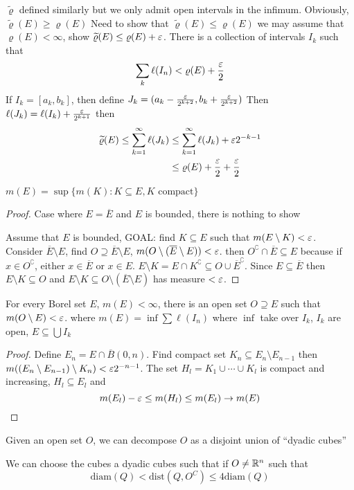 \begin{remark}
  $\widetilde{\varrho}$ defined similarly but we only admit open intervals in the infimum.
  Obviously, $\widetilde{\varrho}(E) \ge \varrho(E)$
  Need to show that $\widetilde{\varrho}(E)\le \varrho(E)$
  we may assume that $\varrho(E) < \infty$, show $\widetilde{\varrho}(E) \le \varrho(E) + \varepsilon$.
  There is a collection of intervals $I_k$ such that
  \[\sum_k \ell(I_n) < \varrho(E) + \frac{\varepsilon}2\]
  If $I_k = [a_k, b_k]$, then define $J_k = (a_k - \frac{\varepsilon}{2^{k+2}}, b_k + \frac{\varepsilon}{2^{k+2}})$
  Then $\ell(J_k) = \ell(I_k) + \frac{\varepsilon}{2^{k+1}}$ then
  \begin{align*}
    \widetilde{\varrho}(E) \le \sum_{k=1}^\infty \ell(J_k) &\le \sum_{k=1}^\infty \ell(J_k) + \varepsilon2^{-k-1} \\
    &\le \varrho(E) + \frac{\varepsilon}2 + \frac{\varepsilon}2
  \end{align*}

\end{remark}



\begin{lemma}
  $m(E) = \sup\{m(K) : K \subseteq E, K \text{ compact}\}$
\end{lemma}

\begin{proof}
  Case where $E = \overline{E}$ and $E$ is bounded, there is nothing to show

  Assume that $E$ is bounded, GOAL: find $K \subseteq E$ such that $m(E\setminus K) < \varepsilon$.
  Consider $\overline{E} \setminus E$, find $O \supseteq \overline{E} \setminus E$, $m(O\setminus (\overline{E} \setminus E)) < \varepsilon$.
  then $O^\complement \cap \overline{E} \subseteq E$ because if $x \in O^\complement$, either $x \in \overline{E}$ or $x \in E$.
  $E \setminus K = E \cap K^\complement \subseteq O \cup \overline{E}^\complement$.
  Since $E \subseteq \overline{E}$ then $E\setminus K \subseteq O$ and $E\setminus K \subseteq O \setminus (\overline{E} \setminus{E})$ 
  has measure $< \varepsilon$.
\end{proof}
\begin{theorem}
  For every Borel set $E$, $m(E) < \infty$, there is an open set $O\supseteq E$ such that $m(O\setminus E) < \varepsilon$.
  where $m(E) = \inf \sum \ell(I_n)$ where $\inf$ take over $I_k$, $I_k$ are open, $E \subseteq \bigcup I_k$
\end{theorem}

\begin{proof}
  Define $E_n = E \cap \overline{B}(0, n)$. Find compact set $K_n \subseteq E_n \setminus E_{n-1}$ then
  $m((E_n \setminus E_{n-1})\setminus K_n) < \varepsilon 2^{-n-1}$.
  The set $H_l = K_1 \cup \cdots \cup K_l$ is compact and increasing, $H_l \subseteq E_l$ and 
  \[m(E_l) - \varepsilon \le m(H_l) \le m(E_l) \to m(E)\]
\end{proof}

\begin{theorem}
  Given an open set $O$, we can decompose $O$ as a disjoint union of ``dyadic cubes''
\end{theorem}

\begin{theorem}
  We can choose the cubes a dyadic cubes such that if $O \neq \mathbb R^n$ such that 
  \[\mathrm{diam}(Q)<\mathrm{dist}(Q, O^C) \le 4 \mathrm{diam}(Q)\]
\end{theorem}

